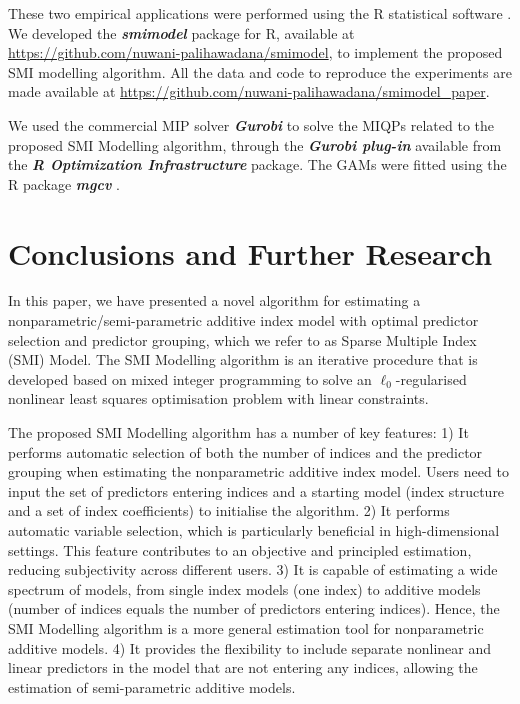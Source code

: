 \documentclass[
  11pt,
  a4paper,
]{article}
\begin{document}
These two empirical applications were performed using the R statistical
software \autocite{Rcore}. We developed the \textbf{\emph{smimodel}}
package for R, available at
\url{https://github.com/nuwani-palihawadana/smimodel}, to implement the
proposed SMI modelling algorithm. All the data and code to reproduce the
experiments are made available at
\url{https://github.com/nuwani-palihawadana/smimodel_paper}.

We used the commercial MIP solver \textbf{\emph{Gurobi}}
\autocite{gurobi2023} to solve the MIQPs related to the proposed SMI
Modelling algorithm, through the \textbf{\emph{Gurobi plug-in}}
\autocite[ROI.plugin.gurobi,][]{Schwendinger2023} available from the
\textbf{\emph{R Optimization Infrastructure}}
\autocites[ROI,][]{Hornik2023,Theusl2020} package. The GAMs were fitted
using the R package \textbf{\emph{mgcv}} \autocite{mgcv,Wood2011}.

\section{Conclusions and Further Research}\label{sec-conclusion}

In this paper, we have presented a novel algorithm for estimating a
nonparametric/semi-parametric additive index model with optimal
predictor selection and predictor grouping, which we refer to as Sparse
Multiple Index (SMI) Model. The SMI Modelling algorithm is an iterative
procedure that is developed based on mixed integer programming to solve
an \(\ell_{0}\)-regularised nonlinear least squares optimisation problem
with linear constraints.

The proposed SMI Modelling algorithm has a number of key features: 1) It
performs automatic selection of both the number of indices and the
predictor grouping when estimating the nonparametric additive index
model. Users need to input the set of predictors entering indices and a
starting model (index structure and a set of index coefficients) to
initialise the algorithm. 2) It performs automatic variable selection,
which is particularly beneficial in high-dimensional settings. This
feature contributes to an objective and principled estimation, reducing
subjectivity across different users. 3) It is capable of estimating a
wide spectrum of models, from single index models (one index) to
additive models (number of indices equals the number of predictors
entering indices). Hence, the SMI Modelling algorithm is a more general
estimation tool for nonparametric additive models. 4) It provides the
flexibility to include separate nonlinear and linear predictors in the
model that are not entering any indices, allowing the estimation of
semi-parametric additive models.
\end{document}

